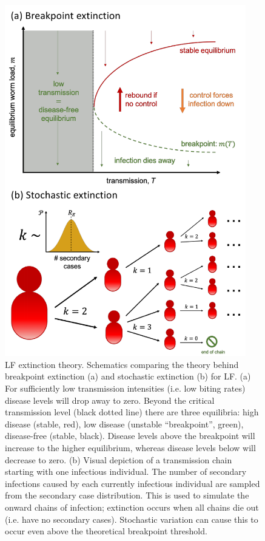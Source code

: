 \begin{figure}
    \centering
    \includegraphics[height=15.3cm]{Project/Figures/LFElimination/Figure1.pdf}
    \caption{LF extinction theory. Schematics comparing the theory behind breakpoint extinction (a) and stochastic extinction (b) for LF. (a) For sufficiently low transmission intensities (i.e. low biting rates) disease levels will drop away to zero. Beyond the critical transmission level (black dotted line) there are three equilibria: high disease (stable, red), low disease (unstable “breakpoint”, green), disease-free (stable, black). Disease levels above the breakpoint will increase to the higher equilibrium, whereas disease levels below will decrease to zero. (b) Visual depiction of a transmission chain starting with one infectious individual. The number of secondary infections caused by each currently infectious individual are sampled from the secondary case distribution. This is used to simulate the onward chains of infection; extinction occurs when all chains die out (i.e. have no secondary cases). Stochastic variation can cause this to occur even above the theoretical breakpoint threshold.}
    \label{fig:Elim_1}
\end{figure}

